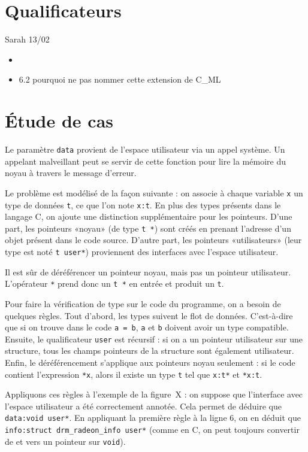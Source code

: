 \section{Qualificateurs}

Sarah 13/02

\begin{itemize}
\item
\item
  6.2 pourquoi ne pas nommer cette extension de C\_ML
\end{itemize}

\section{Étude de cas}%

Le paramètre \texttt{data} provient de l'espace utilisateur via un appel
système. Un appelant malveillant peut se servir de cette fonction pour lire la
mémoire du noyau à travers le message d'erreur.

Le problème est modélisé de la façon suivante : on associe à chaque variable
\texttt{x} un type de données \texttt{t}, ce que l'on note \texttt{x:t}. En
plus des types présents dans le langage C, on ajoute une distinction
supplémentaire pour les pointeurs. D'une part, les pointeurs «noyau» (de type
\texttt{t~*}) sont créés en prenant l'adresse d'un objet présent dans le code
source. D'autre part, les pointeurs «utilisateurs» (leur type est noté
\texttt{t user*}) proviennent des interfaces avec l'espace utilisateur.

Il est sûr de déréférencer un pointeur noyau, mais pas un pointeur
utilisateur. L'opérateur \texttt{*} prend donc un \texttt{t *} en entrée
et produit un \texttt{t}.

Pour faire la vérification de type sur le code du programme, on a besoin de
quelques règles. Tout d'abord, les types suivent le flot de données.
C'est-à-dire que si on trouve dans le code \texttt{a = b}, \texttt{a} et
\texttt{b} doivent avoir un type compatible. Ensuite, le qualificateur
\texttt{user} est récursif : si on a un pointeur utilisateur sur une structure,
tous les champs pointeurs de la structure sont également utilisateur. Enfin, le
déréférencement s'applique aux pointeurs noyau seulement : si le code contient
l'expression \texttt{*x}, alors il existe un type \texttt{t} tel que
\texttt{x:t*} et \texttt{*x:t}.

Appliquons ces règles à l'exemple de la figure~X : on suppose que l'interface
avec l'espace utilisateur a été correctement annotée. Cela permet de déduire que
\texttt{data:void user*}. En appliquant la première règle à la ligne 6, on en
déduit que \texttt{info:struct drm\_radeon\_info user*} (comme en C, on peut
toujours convertir de et vers un pointeur sur \texttt{void}).


